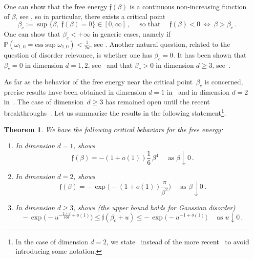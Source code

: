 \documentclass[11pt]{amsart}
\numberwithin{equation}{section}
\newcommand*{\PP}{\mathbb{P}}
\newcommand*{\tf}{\mathfrak{f}}
\theoremstyle{plain}
\newtheorem{theoremalpha}{Theorem}
\theoremstyle{definition}
\theoremstyle{remark}
\begin{document}
One can show that the free energy \(\tf(\beta)\) is a continuous non-increasing function of \(\beta\), see \cite[Theorem~2.3]{Com17}, so in particular, there exists a critical point
\[
\beta_c := \sup\{\beta,\; \tf(\beta) =0\}  \in [0,\infty] \,, \quad \text{ so that }\quad \tf(\beta)<0 \ \Leftrightarrow \ \beta>\beta_c \,.
\]
One can show that \(\beta_c<+\infty\) in generic cases, namely if \(\PP(\omega_{1,0}= \mathrm{ess}\sup \omega_{1,0}) <\frac{1}{2d}\), see \cite[Corollary~2.1]{Com17}.
Another natural question, related to the question of disorder relevance, is whether one has \(\beta_c=0\).
It has been shown that \(\beta_c=0\) in dimension \(d=1,2\), see~\cite{CV06,Lac10a} and that \(\beta_c >0\) in dimension \(d\geq 3\), see~\cite{Bol89}.

As far as the behavior of the free energy near the critical point~\(\beta_c\) is concerned, precise results have been obtained in dimension \(d=1\) in~\cite{AY15,Lac10a,Nak19} and in dimension \(d=2\) in~\cite{BCT25,BL17,Lac10a,Nak14}.
The case of dimension~\(d\geq 3\) has remained open until the recent breakthroughs~\cite{JL26,Lac25}.
Let us summarize the results in the following statement\footnote{In the case of dimension \(d=2\), we state~\cite{BL17} instead of the more recent~\cite{BCT25} to avoid introducing some notation.}.

\begin{theoremalpha}
       \label{thm:existing}
       We have the following critical behaviors for the free energy:
       \begin{enumerate}[label=(\roman*)]
              \item 
              In dimension \(d=1\), \cite{Nak19} shows
              \[
              \tf(\beta) = - (1+o(1)) \frac16 \, \beta^4 \quad \text{ as } \beta\downarrow 0 \,.
              \]

              \item \label{item-ii}
              In dimension \(d=2\), \cite{BL17} shows 
              \[
              \tf(\beta) =  -\, \exp\Big( - (1+o(1)) \frac{\pi}{\beta^2} \Big) \quad \text{ as } \beta\downarrow 0 \,.
              \]
              

              \item 
              In dimension \(d\geq 3\), \cite{JL26} shows (the upper bound holds for Gaussian disorder) 
              \[
               -\, \exp\Big(- u^{- \frac{2+d}{10 d} +o(1)} \Big) \leq \tf(\beta_c +u) \leq -\, \exp\Big(- u^{-1+o(1)} \Big) \quad \text{ as } u\downarrow 0 \,.
              \]
       \end{enumerate}
\end{theoremalpha}
\end{document}
